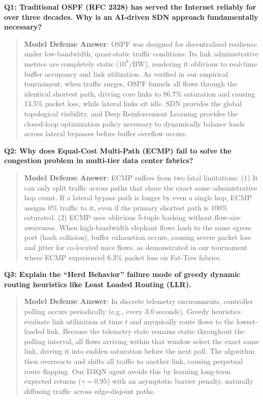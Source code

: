 \noindent\textbf{Q1: Traditional OSPF (RFC 2328) has served the Internet reliably for over three decades. Why is an AI-driven SDN approach fundamentally necessary?}
\begin{quote}
\small
\textbf{Model Defense Answer}: OSPF was designed for decentralized resilience under low-bandwidth, quasi-static traffic conditions. Its link administrative metrics are completely static ($10^8 / \text{BW}$), rendering it oblivious to real-time buffer occupancy and link utilization. As verified in our empirical tournament, when traffic surges, OSPF funnels all flows through the identical shortest path, driving core links to 86.7\% saturation and causing 13.5\% packet loss, while lateral links sit idle. SDN provides the global topological visibility, and Deep Reinforcement Learning provides the closed-loop optimization policy necessary to dynamically balance loads across lateral bypasses before buffer overflow occurs.
\end{quote}

\noindent\textbf{Q2: Why does Equal-Cost Multi-Path (ECMP) fail to solve the congestion problem in multi-tier data center fabrics?}
\begin{quote}
\small
\textbf{Model Defense Answer}: ECMP suffers from two fatal limitations: (1) It can only split traffic across paths that share the exact same administrative hop count. If a lateral bypass path is longer by even a single hop, ECMP assigns 0\% traffic to it, even if the primary shortest path is 100\% saturated. (2) ECMP uses oblivious 5-tuple hashing without flow-size awareness. When high-bandwidth elephant flows hash to the same egress port (hash collision), buffer exhaustion occurs, causing severe packet loss and jitter for co-located mice flows, as demonstrated in our tournament where ECMP experienced 6.3\% packet loss on Fat-Tree fabrics.
\end{quote}

\noindent\textbf{Q3: Explain the ``Herd Behavior'' failure mode of greedy dynamic routing heuristics like Least Loaded Routing (LLR).}
\begin{quote}
\small
\textbf{Model Defense Answer}: In discrete telemetry environments, controller polling occurs periodically (e.g., every 3.0 seconds). Greedy heuristics evaluate link utilization at time $t$ and myopically route flows to the lowest-loaded link. Because the telemetry state remains static throughout the polling interval, all flows arriving within that window select the exact same link, driving it into sudden saturation before the next poll. The algorithm then overreacts and shifts all traffic to another link, causing perpetual route flapping. Our D3QN agent avoids this by learning long-term expected returns ($\gamma = 0.95$) with an asymptotic barrier penalty, naturally diffusing traffic across edge-disjoint paths.
\end{quote}


